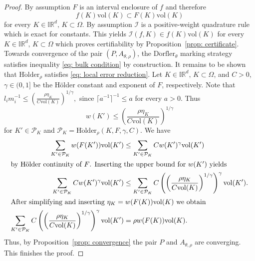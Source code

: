 \documentclass[a4paper, 11pt]{article}
\newcommand{\vol}{\mathrm{vol}}
\begin{document}
	\begin{proof}
		By assumption $F$ is an interval enclosure of $f$ and therefore
		$$ f(K) \vol(K) \subset F(K)\vol(K)$$
		for every $K \in \mathbb{IR}^d, \, K \subset \Omega$. By assumption $\mathcal{I}$ is a positive-weight quadrature rule which is exact for constants. This yields $\mathcal{I}(f,K) \in f(K)\vol(K)$ for every $K \in \mathbb{IR}^d, \, K \subset \Omega$ which proves certifiability by Proposition~\ref{prop: certificate}. Towards convergence of the pair $(P, A_{\theta,\rho})$, the $\mathrm{D\ddot orfler}_\theta$ marking strategy satisfies inequality \eqref{eq: bulk condition} by construction. It remains to be shown that $\mathrm{H\ddot older}_\rho$ satisfies \eqref{eq: local error reduction}.  
		Let $K \in \mathbb{IR}^d, \, K \subset \Omega$, and $C>0$, $\gamma\in(0,1]$ be the Hölder constant and exponent of $F$, respectively. Note that
		$ l_im_i^{-1} \leq \left(\frac{\rho \eta_K}{C \vol(K)}\right)^{1/\gamma}, $
		since $\lceil a^{-1}\rceil ^{-1} \leq a$ for every $a>0$. Thus 
		$$w(K') \leq \left(\frac{\rho \eta_K}{C \vol(K)}\right)^{1/\gamma}$$
		for $K' \in \mathcal{P}_K$ and $\mathcal{P}_K = \mathrm{H \ddot older}_{\rho}(K,F,\gamma,C)$.
		We have
		\begin{align*}
			\sum_{K' \in \mathcal{P}_K} w(F(K'))\vol(K')   &\leq \sum_{K' \in \mathcal{P}_K} Cw(K')^\gamma\vol(K' ) \\
			\intertext{by Hölder continuity of $F$. Inserting the upper bound for $w(K')$ yields}
			\sum_{K' \in \mathcal{P}_K} Cw(K')^\gamma\vol(K' ) &\leq \sum_{K' \in \mathcal{P}_K} C\left( \left(\frac{\rho \eta_K}{C \vol(K)}\right)^{1/\gamma}\right)^\gamma \vol(K').\\
			\intertext{After simplifying and inserting $\eta_K = w(F(K))\vol(K)$ we obtain}
			\sum_{K' \in \mathcal{P}_K} C\left( \left(\frac{\rho \eta_K}{C \vol(K)}\right)^{1/\gamma}\right)^\gamma \vol(K') &= \rho w(F(K))\vol(K).
		\end{align*}
		Thus, by Proposition~\ref{prop: convergence} the pair $P$ and {$A_{\theta,\rho}$} are converging. This finishes the proof.
	\end{proof}
	
\end{document}
